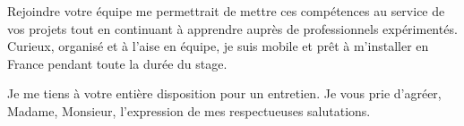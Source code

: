 \documentclass[11pt,a4paper]{article}
\begin{document}
\noindent
\textcolor{textgray}{Rejoindre votre équipe me permettrait de mettre ces compétences au service de vos projets tout en continuant à apprendre auprès de professionnels expérimentés. Curieux, organisé et à l'aise en équipe, je suis mobile et prêt à m'installer en France pendant toute la durée du stage.}

\vspace{0.4cm}

\noindent
\textcolor{textgray}{Je me tiens à votre entière disposition pour un entretien. Je vous prie d'agréer, Madame, Monsieur, l'expression de mes respectueuses salutations.}

\vfill

\hfill
{}
\end{document}
